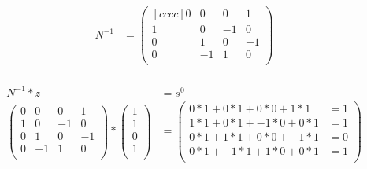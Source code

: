 \documentclass[12pt,a4paper,final,onecolumn,oneside]{article}
\begin{document}
\begin{enumerate}[label=(\alph*)]
    \begin{equation*}
        \begin{aligned}
            N^{-1} &= 
            \begin{pmatrix}[cccc]
                0 & 0 & 0 & 1 \\
                1 & 0 & -1 & 0 \\
                0 & 1 & 0 & -1 \\
                0 & -1 & 1 & 0 \\
            \end{pmatrix} \\
        \end{aligned}
    \end{equation*}
    
    \begin{equation*}
        \begin{aligned}
            N^{-1} * z &= s^0 \\
            \begin{pmatrix}
                0 & 0 & 0 & 1 \\
                1 & 0 & -1 & 0 \\
                0 & 1 & 0 & -1 \\
                0 & -1 & 1 & 0 \\
            \end{pmatrix}
            *
            \begin{pmatrix}
                1 \\
                1 \\
                0 \\
                1 \\
            \end{pmatrix}
            &=
            \begin{pmatrix}
                0*1 + 0*1 + 0*0 + 1*1 &= 1 \\
                1*1 + 0*1 + -1*0 + 0*1 &= 1 \\
                0 * 1 + 1 * 1 + 0 * 0 + -1 * 1 &= 0 \\
                0 * 1 + -1 * 1 + 1 * 0 + 0 * 1 &= 1 \\
            \end{pmatrix}
        \end{aligned}
    \end{equation*}
     

\end{enumerate}
\end{document}
